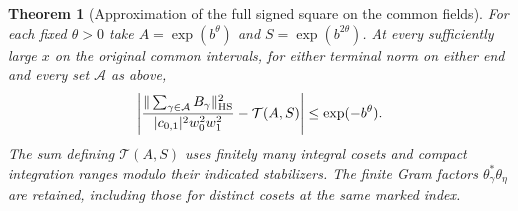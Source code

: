 \documentclass[a4paper,11pt]{article}
\newtheorem{theorem}[proposition]{Theorem}
\theoremstyle{definition}
\theoremstyle{remark}
\numberwithin{equation}{section}
\begin{document}
\begin{theorem}[Approximation of the full signed square on the common fields]
\leavevmode\label{thm:signedcompact621}
For each fixed \(\theta>0\) take \(A=\exp(b^\theta)\) and
\(S=\exp(b^{2\theta})\). At every sufficiently large \(x\)
on the original common intervals, for either terminal norm
on either end and every set \(\mathcal A\) as above,
\[
 \left|
 \frac{\|\sum_{\gamma\in\mathcal A} B_\gamma\|_{\rm HS}^2}
      {|c_{0,1}|^2w_0^2w_1^2}
             -\mathcal T(A,S)\right|\le \exp(-b^\theta).
\]
The sum defining \(\mathcal T(A,S)\) uses finitely many integral
cosets and compact integration ranges modulo their indicated
stabilizers. The finite Gram factors \(\theta_\gamma^*\theta_\eta\)
are retained, including those for distinct cosets at the same
marked index.
\end{theorem}
\end{document}
